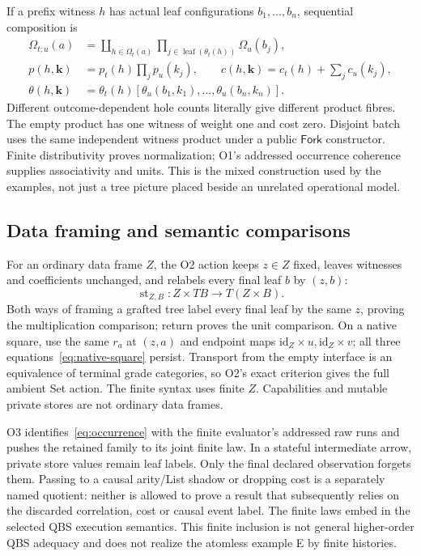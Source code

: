 \documentclass[11pt,a4paper]{article}
\theoremstyle{definition}
\newcommand{\id}{\mathrm{id}}
\newcommand{\leaf}{\operatorname{leaf}}
\begin{document}
If a prefix witness $h$ has actual leaf configurations $b_1,\ldots,b_n$,
sequential composition is
\begin{equation}\label{eq:occurrence}
\begin{split}
\Omega_{t;u}(a)&=\coprod_{h\in\Omega_t(a)}
              \prod_{j\in\leaf(\theta_t(h))}\Omega_u(b_j),\\
p(h,\mathbf k)&=p_t(h)\prod_jp_u(k_j),\qquad
c(h,\mathbf k)=c_t(h)+\sum_jc_u(k_j),\\
\theta(h,\mathbf k)&=\theta_t(h)[\theta_u(b_1,k_1),\ldots,
                                      \theta_u(b_n,k_n)].
\end{split}
\end{equation}
Different outcome-dependent hole counts literally give different product
fibres. The empty product has one witness of weight one and cost zero.
Disjoint batch uses the same independent witness product under a public
$\mathsf{Fork}$ constructor. Finite distributivity proves normalization;
O1's addressed occurrence coherence supplies associativity and units.
This is the mixed construction used by the examples, not just a tree
picture placed beside an unrelated operational model.

\subsection{Data framing and semantic comparisons}\label{sec:core-frame}
For an ordinary data frame $Z$, the O2 action keeps $z\in Z$ fixed,
leaves witnesses and coefficients unchanged, and relabels every final
leaf $b$ by $(z,b)$:
\[
\operatorname{st}_{Z,B}:Z\times TB\longrightarrow T(Z\times B).
\]
Both ways of framing a grafted tree label every final leaf by the same
$z$, proving the multiplication comparison; return proves the unit
comparison. On a native square, use the same $r_a$ at $(z,a)$ and endpoint
maps $\id_Z\times u,\id_Z\times v$; all three
 equations~\eqref{eq:native-square} persist. Transport from the empty
interface is an equivalence of terminal grade categories, so O2's exact
criterion gives the full ambient Set action. The finite syntax uses finite
$Z$. Capabilities and mutable private stores are not ordinary data frames.

O3 identifies~\eqref{eq:occurrence} with the finite evaluator's addressed
raw runs and pushes the retained family to its joint finite law. In a
stateful intermediate arrow, private store values remain leaf labels.
Only the final declared observation forgets them. Passing to a causal
arity/List shadow or dropping cost is a separately named quotient: neither
is allowed to prove a result that subsequently relies on the discarded
correlation, cost or causal event label. The finite laws embed in the
selected QBS execution semantics. This finite inclusion is not general
higher-order QBS adequacy and does not realize the atomless example E by
finite histories.
\end{document}
